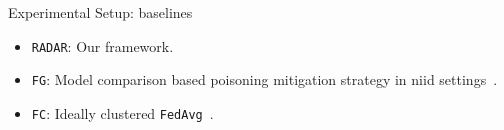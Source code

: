 \begin{frame}{Experimental Setup: baselines}
      \begin{itemize}
        \item \texttt{RADAR}: Our framework.
        \item \texttt{FG}: Model comparison based poisoning mitigation strategy in \gls{niid} settings~\cite{fung_LimitationsFederatedLearning_2020}.
        \item \texttt{FC}: Ideally clustered \texttt{FedAvg}~\cite{mcmahan_Communicationefficientlearningdeep_2017}.
      \end{itemize}
\end{frame}
